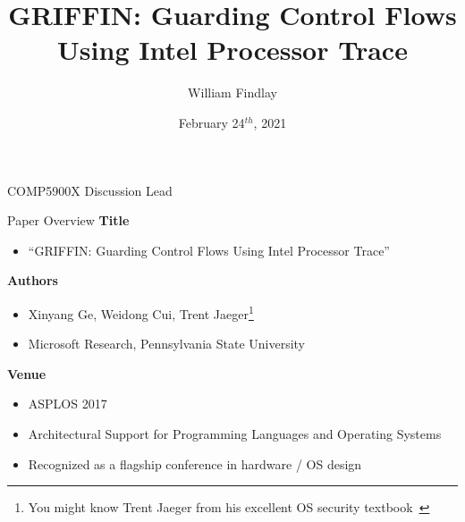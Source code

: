 \documentclass[12pt, dvipsnames, aspectratio=169]{beamer}
\date{February 24$^{th}$, 2021}
\title{GRIFFIN\@: Guarding Control Flows Using Intel Processor Trace}
\author{William Findlay}
\institute{Carleton University\\\href{mailto:will@ccsl.carleton.ca}{\ttfamily will@ccsl.carleton.ca}}
\begin{document}

\begin{frame}
  \titlepage%
  \vfill
  \vspace{4em}
  {\footnotesize COMP5900X Discussion Lead}
\end{frame}

%

\begin{frame}[c]{Paper Overview}{}
  {\bf Title}
  \begin{itemize}
    \item \enquote{GRIFFIN\@: Guarding Control Flows Using Intel Processor Trace}
  \end{itemize}

  \vfill
  {\bf Authors}
  \begin{itemize}
    \item Xinyang Ge, Weidong Cui, Trent Jaeger\footnote{You might know Trent Jaeger from his excellent OS security textbook~\cite{ge2017_griffin}}
    \item Microsoft Research, Pennsylvania State University
  \end{itemize}

  \vfill
  {\bf Venue}
  \begin{itemize}
    \item ASPLOS 2017
    \item Architectural Support for Programming Languages and Operating Systems
    \item Recognized as a flagship conference in hardware / OS design
  \end{itemize}
\end{frame}
\end{document}

